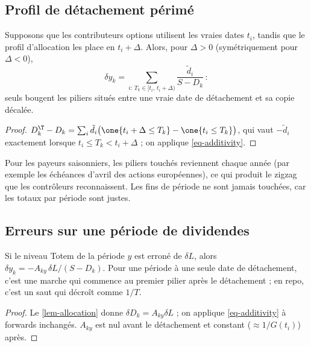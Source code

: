 \subsection{Profil de détachement périmé}
\begin{proposition}\label{prop-profile}
Supposons que les contributeurs options utilisent les vraies dates $t_i$, tandis que le profil d'allocation les
place en $t_i+\Delta$. Alors, pour $\Delta>0$ (symétriquement pour $\Delta<0$),
\[
\delta y_k=\sum_{i:\,T_k\in[t_i,\,t_i+\Delta)}\frac{\tilde d_i}{S-D_k}\,:
\]
seuls bougent les piliers situés entre une vraie date de détachement et sa copie décalée.
\end{proposition}
\begin{proof}
$D^\T_k-D_k=\sum_i\tilde d_i\bigl(\one\{t_i+\Delta\le T_k\}-\one\{t_i\le T_k\}\bigr)$, qui vaut $-\tilde d_i$ exactement
lorsque $t_i\le T_k<t_i+\Delta$ ; on applique \cref{eq-additivity}.
\end{proof}
Pour les payeurs saisonniers, les piliers touchés reviennent chaque année (par exemple les échéances d'avril des
actions européennes), ce qui produit le zigzag que les contrôleurs reconnaissent. Les fins de période ne sont jamais
touchées, car les totaux par période sont justes.

\subsection{Erreurs sur une période de dividendes}
\begin{proposition}\label{prop-bucket}
Si le niveau Totem de la période $y$ est erroné de $\delta L$, alors $\delta y_k=-A_{ky}\,\delta L/(S-D_k)$. Pour une
période à une seule date de détachement, c'est une marche qui commence au premier pilier après le détachement ; en
repo, c'est un saut qui décroît comme $1/T$.
\end{proposition}
\begin{proof}
Le \cref{lem-allocation} donne $\delta D_k=A_{ky}\delta L$ ; on applique \cref{eq-additivity} à forwards inchangés.
$A_{ky}$ est nul avant le détachement et constant ($\approx1/G(t_i)$) après.
\end{proof}

